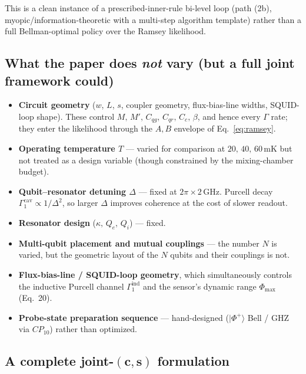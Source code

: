\documentclass[11pt,a4paper]{article}
\begin{document}
This is a clean instance of a prescribed-inner-rule bi-level loop (path (2b), myopic/information-theoretic with a multi-step algorithm template) rather than a full Bellman-optimal policy over the Ramsey likelihood.

\subsection{What the paper does \emph{not} vary (but a full joint framework could)}

\begin{itemize}[nosep,leftmargin=2em]
  \item \textbf{Circuit geometry} ($w$, $L$, $s$, coupler geometry, flux-bias-line widths, SQUID-loop shape).  These control $M,\,M',\,C_{qg},\,C_{qr},\,C_c,\,\beta$, and hence every $\Gamma$ rate; they enter the likelihood through the $A,B$ envelope of Eq.~\eqref{eq:ramsey}.
  \item \textbf{Operating temperature $T$} --- varied for comparison at $20,\,40,\,60$\,mK but not treated as a design variable (though constrained by the mixing-chamber budget).
  \item \textbf{Qubit--resonator detuning $\Delta$} --- fixed at $2\pi\times 2\,$GHz.  Purcell decay $\Gamma_1^{\mathrm{cav}} \propto 1/\Delta^2$, so larger $\Delta$ improves coherence at the cost of slower readout.
  \item \textbf{Resonator design} ($\kappa,\,Q_e,\,Q_i$) --- fixed.
  \item \textbf{Multi-qubit placement and mutual couplings} --- the number $N$ is varied, but the geometric layout of the $N$ qubits and their couplings is not.
  \item \textbf{Flux-bias-line / SQUID-loop geometry}, which simultaneously controls the inductive Purcell channel $\Gamma_1^{\mathrm{ind}}$ and the sensor's dynamic range $\Phi_{\max}$ (Eq.~20).
  \item \textbf{Probe-state preparation sequence} --- hand-designed ($|\Phi^+\rangle$ Bell / GHZ via $CP_{10}$) rather than optimized.
\end{itemize}

\subsection{A complete joint-\texorpdfstring{$(\bm{c},\bm{s})$}{(c,s)} formulation}
\end{document}
